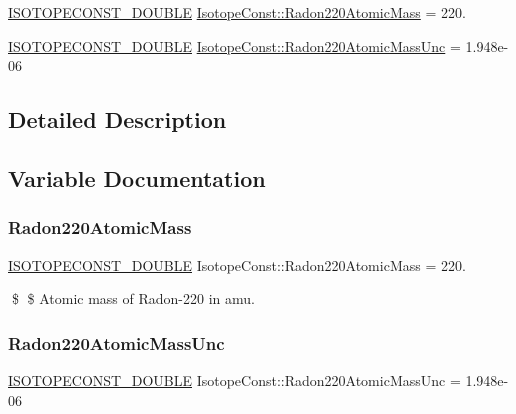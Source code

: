 \begin{DoxyCompactItemize}
\item 
\mbox{\hyperlink{group___isotope_const-_macros_ga8f45a7272ce02c0b4c65c44636ed719a}{I\+S\+O\+T\+O\+P\+E\+C\+O\+N\+S\+T\+\_\+\+D\+O\+U\+B\+LE}} \mbox{\hyperlink{group___isotope_const-_radon-_rn220_gaf743b3519930fdbec76d8045171a3152}{Isotope\+Const\+::\+Radon220\+Atomic\+Mass}} = 220.
\item 
\mbox{\hyperlink{group___isotope_const-_macros_ga8f45a7272ce02c0b4c65c44636ed719a}{I\+S\+O\+T\+O\+P\+E\+C\+O\+N\+S\+T\+\_\+\+D\+O\+U\+B\+LE}} \mbox{\hyperlink{group___isotope_const-_radon-_rn220_ga2ccd86742a26fd0232798b96bcb3a30c}{Isotope\+Const\+::\+Radon220\+Atomic\+Mass\+Unc}} = 1.\+948e-\/06
\end{DoxyCompactItemize}


\subsection{Detailed Description}


\subsection{Variable Documentation}
\mbox{\label{group___isotope_const-_radon-_rn220_gaf743b3519930fdbec76d8045171a3152}} 
\subsubsection{\texorpdfstring{Radon220\+Atomic\+Mass}{Radon220AtomicMass}}
{\footnotesize\ttfamily \mbox{\hyperlink{group___isotope_const-_macros_ga8f45a7272ce02c0b4c65c44636ed719a}{I\+S\+O\+T\+O\+P\+E\+C\+O\+N\+S\+T\+\_\+\+D\+O\+U\+B\+LE}} Isotope\+Const\+::\+Radon220\+Atomic\+Mass = 220.}

\$ \$ Atomic mass of Radon-\/220 in amu. \mbox{\label{group___isotope_const-_radon-_rn220_ga2ccd86742a26fd0232798b96bcb3a30c}} 
\subsubsection{\texorpdfstring{Radon220\+Atomic\+Mass\+Unc}{Radon220AtomicMassUnc}}
{\footnotesize\ttfamily \mbox{\hyperlink{group___isotope_const-_macros_ga8f45a7272ce02c0b4c65c44636ed719a}{I\+S\+O\+T\+O\+P\+E\+C\+O\+N\+S\+T\+\_\+\+D\+O\+U\+B\+LE}} Isotope\+Const\+::\+Radon220\+Atomic\+Mass\+Unc = 1.\+948e-\/06}

